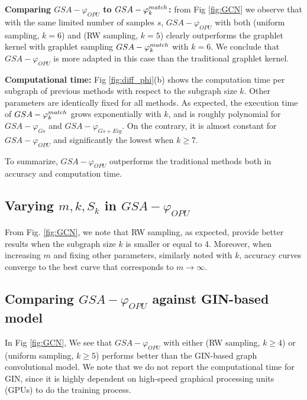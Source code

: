 \documentclass{article}
\begin{document}
\noindent\textbf{Comparing $GSA-\varphi_{OPU}$ to $GSA-\varphi^{match}_k$:} from Fig \ref{fig:GCN} we observe that  with the same limited number of samples $s$, $GSA-\varphi_{OPU}$ with both (uniform sampling, $k=6$) and (RW sampling, $k=5$)  clearly outperforms the graphlet kernel with graphlet sampling $GSA-\varphi^{match}_k$ with $k=6$.  We conclude that $GSA-\varphi_{OPU}$ is more adapted in this case than the traditional graphlet kernel. 

\noindent\textbf{Computational time:} Fig \ref{fig:diff_phi}(b) shows the computation time per subgraph of  previous methods with respect to the subgraph size $k$. Other parameters are identically fixed for all methods. As expected, the execution time of $GSA-\varphi^{match}_k$ grows exponentially with  $k$, and is roughly polynomial for $GSA-\varphi_{Gs}$ and $GSA-\varphi_{Gs+Eig}$. On the contrary, it is almost constant for $GSA-\varphi_{OPU}$ and significantly the lowest when $k\geq7$. 

To summarize, $GSA-\varphi_{OPU}$ outperforms the traditional methods both in accuracy and computation time.

\subsection{Varying $m, k, S_k$ in $GSA-{\varphi_{OPU}}$}
From Fig. \ref{fig:GCN}, we note  that  RW sampling, as expected, provide better results when the subgraph size $k$  is smaller or equal to 4. Moreover, when increasing $m$ and fixing other parameters, similarly noted with $k$, accuracy curves converge to the best curve that corresponds to $m\rightarrow\infty$.

\subsection{Comparing $GSA-\varphi_{OPU}$ against GIN-based model}\label{sec:vs_GIN}

In Fig \ref{fig:GCN}, We see that $GSA-\varphi_{OPU}$ with either (RW sampling, $k\geq4$) or (uniform sampling, $k\geq5$) performs better than the GIN-based graph convolutional model. We note that we do not report the computational time for GIN, since it is highly dependent on high-speed graphical processing units (GPUs) to do the training process.
\end{document}
